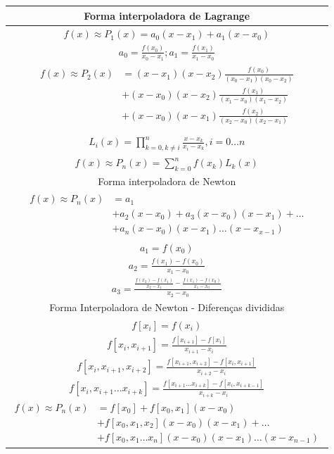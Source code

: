 \documentclass{article}
\begin{document}
\begin{minipage}[!t]{.5\textwidth}
\begin{tabularx}{\textwidth}{c}
\toprule
Forma interpoladora de Lagrange\\
\midrule
$f(x) \approx P_1(x) = a_0(x-x_1) + a_1(x-x_0)$\\
$a_0 = \frac{f(x_0)}{x_0-x_1} ; a_1 = \frac{f(x_1)}{x_1-x_0}$ \\
$\begin{aligned}
f(x) \approx P_2(x) &= (x-x_1)(x-x_2)\frac{f(x_0)}{(x_0-x_1)(x_0-x_2)}\\ 
&+ (x-x_0)(x-x_2)\frac{f(x_1)}{(x_1-x_0)(x_1-x_2)} \\
&+ (x-x_0)(x-x_1)\frac{f(x_2)}{(x_2-x_0)(x_2-x_1)}\\
\end{aligned}$\\
\hline
$ L_i(x) = \displaystyle\prod_{k=0,k \neq i}^{n} \frac{x-x_k}{x_i-x_k} , i = 0 \dots n$\\
$f(x) \approx P_n(x)= \displaystyle\sum_{k=0}^n f(x_k)L_k(x)$\\
\midrule
Forma interpoladora de Newton\\
\midrule
$\begin{aligned}
f(x) \approx P_n(x) &= a_1 \\
&+ a_2(x-x_0) + a_3(x-x_0)(x-x_1) + \dots\\
&+ a_n(x-x_0)(x-x_1)\dots(x-x_{x-1})
\end{aligned}$\\
$a_1 = f(x_0)$\\
$a_2 = \frac{f(x_1)-f(x_0)}{x_1-x_0}$\\
$a_3 = \frac{ \frac{f(x_2)-f(x_1)}{x_2-x_1} - \frac{f(x_1)-f(x_0)}{x_1-x_0}   }{x_2-x_0}$\\
\midrule
Forma Interpoladora de Newton - Diferenças divididas\\
\midrule
$f[x_i] = f(x_i)$\\
$f[x_i,x_{i+1}] = \frac{f[x_{i+1}] - f[x_i]}{x_{i+1}-x_i}$\\

$f[x_i,x_{i+1},x_{i+2}] = \frac{f[x_{i+1},x_{i+2}] - f[x_i,x_{i+1}]}{x_{i+2} - x_i}$\\


$f[x_i,x_{i+1}\dotsc x_{i+k}] = \frac{ f[x_{i+1}\dotsc x_{i+k}] - f[ x_i, x_{i+k-1} ]   }{x_{i+k} - x_i}$\\
$\begin{aligned}
f(x) \approx P_n(x) &= f[x_0] + f[x_0,x_1](x-x_0) \\
&+ f[x_0,x_1,x_2](x-x_0)(x-x_1) + \dots\\
&+ f[x_0,x_1 \dotsc x_n](x-x_0)(x-x_1)\dots(x-x_{n-1})
\end{aligned}$\\



\end{tabularx}
\end{minipage}
\end{document}

